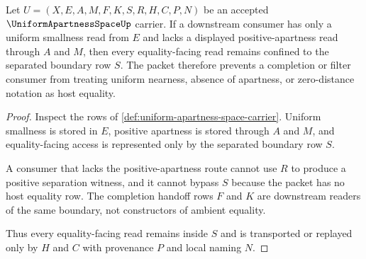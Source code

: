 \begin{theorem}
\label{thm:uniform-apartness-space-separated-uniform-nonescape}
Let $U=(X,E,A,M,F,K,S,R,H,C,P,N)$ be an accepted
$\UniformApartnessSpaceUp$ carrier. If a downstream consumer has only a
uniform smallness read from $E$ and lacks a displayed positive-apartness read
through $A$ and $M$, then every equality-facing read remains confined to the
separated boundary row $S$. The packet therefore prevents a completion or
filter consumer from treating uniform nearness, absence of apartness, or
zero-distance notation as host equality.
\end{theorem}
\begin{proof}
Inspect the rows of \autoref{def:uniform-apartness-space-carrier}. Uniform
smallness is stored in $E$, positive apartness is stored through $A$ and $M$,
and equality-facing access is represented only by the separated boundary
row $S$.

A consumer that lacks the positive-apartness route cannot use $R$ to produce a
positive separation witness, and it cannot bypass $S$ because the packet has
no host equality row. The completion handoff rows $F$ and $K$ are downstream
readers of the same boundary, not constructors of ambient equality.

Thus every equality-facing read remains inside $S$ and is transported or
replayed only by $H$ and $C$ with provenance $P$ and local naming $N$.
\end{proof}




